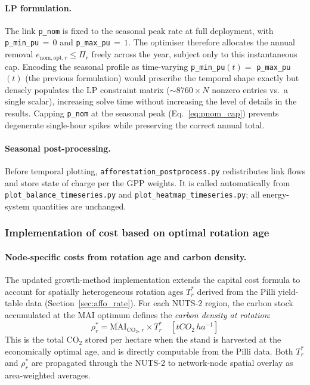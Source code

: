 \documentclass[12pt, a4paper]{article}
\begin{document}
\paragraph{LP formulation.}
The link \texttt{p\_nom} is fixed to the seasonal peak rate at full deployment,
with \texttt{p\_min\_pu}$\,{=}\,0$ and \texttt{p\_max\_pu}$\,{=}\,1$.
The optimiser therefore allocates the annual removal $e_{\mathrm{nom,opt},r}
\le \Pi_r$ freely across the year, subject only to this instantaneous cap.
Encoding the seasonal profile as time-varying \texttt{p\_min\_pu}$(t)
{=}$ \texttt{p\_max\_pu}$(t)$ (the previous formulation) would prescribe the
temporal shape exactly but densely populates the LP constraint matrix
(${\sim}8760 \times N$ nonzero entries vs.\ a single scalar), increasing
solve time without increasing the level of details in the results.
Capping \texttt{p\_nom} at the seasonal peak (Eq.~\ref{eq:pnom_cap}) prevents
degenerate single-hour spikes while preserving the correct annual total.

\paragraph{Seasonal post-processing.}
Before temporal plotting, \texttt{afforestation\_postprocess.py}
redistributes link flows and store state of charge per the GPP weights.
It is called automatically from \texttt{plot\_balance\_\allowbreak timeseries.py}
and \texttt{plot\_heatmap\_\allowbreak timeseries.py}; all energy-system
quantities are unchanged.

\subsubsection{Implementation of cost based on optimal rotation age}
\label{sec:cost }
\paragraph{Node-specific costs from rotation age and carbon density.}
The updated growth-method implementation extends the capital cost formula to account for spatially heterogeneous rotation ages $T^*_r$ derived from the Pilli yield-table data (Section~\ref{sec:affo_rate}).  For each NUTS-2 region, the carbon stock accumulated at the MAI optimum defines the \emph{carbon density at rotation}:
\begin{equation}
  \rho^*_r
  = \overline{\mathrm{MAI}}_{\mathrm{CO}_2,\,r} \times T^*_r
  \quad [\si{tCO_2\,ha^{-1}}]
  \label{eq:density_star}
\end{equation}
This is the total CO$_2$ stored per hectare when the stand is harvested at the economically optimal age, and is directly computable from the Pilli data.  Both $T^*_r$ and $\rho^*_r$ are propagated through the NUTS-2 to network-node spatial overlay as area-weighted averages.
\end{document}
